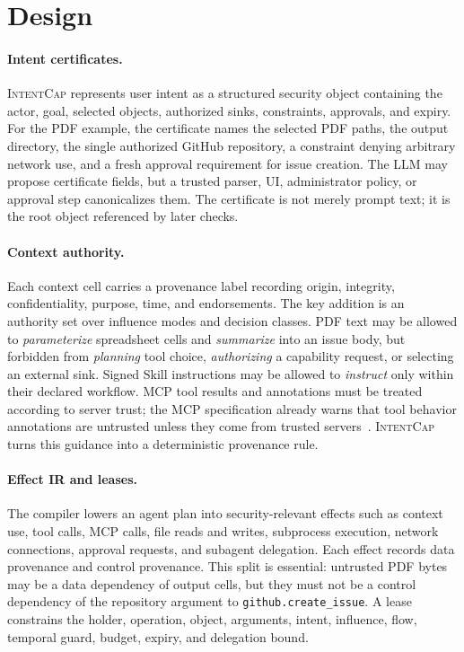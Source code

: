 \documentclass[sigconf,nonacm]{acmart}
\newcommand{\sys}{\textsc{IntentCap}\xspace}
\begin{document}
\section{Design}

\paragraph{Intent certificates.}
\sys represents user intent as a structured security object containing the actor, goal, selected objects, authorized sinks, constraints, approvals, and expiry. For the PDF example, the certificate names the selected PDF paths, the output directory, the single authorized GitHub repository, a constraint denying arbitrary network use, and a fresh approval requirement for issue creation. The LLM may propose certificate fields, but a trusted parser, UI, administrator policy, or approval step canonicalizes them. The certificate is not merely prompt text; it is the root object referenced by later checks.

\paragraph{Context authority.}
Each context cell carries a provenance label recording origin, integrity, confidentiality, purpose, time, and endorsements. The key addition is an authority set over influence modes and decision classes. PDF text may be allowed to \emph{parameterize} spreadsheet cells and \emph{summarize} into an issue body, but forbidden from \emph{planning} tool choice, \emph{authorizing} a capability request, or selecting an external sink. Signed Skill instructions may be allowed to \emph{instruct} only within their declared workflow. MCP tool results and annotations must be treated according to server trust; the MCP specification already warns that tool behavior annotations are untrusted unless they come from trusted servers~\cite{mcp-tools-security}. \sys turns this guidance into a deterministic provenance rule.

\paragraph{Effect IR and leases.}
The compiler lowers an agent plan into security-relevant effects such as context use, tool calls, MCP calls, file reads and writes, subprocess execution, network connections, approval requests, and subagent delegation. Each effect records data provenance and control provenance. This split is essential: untrusted PDF bytes may be a data dependency of output cells, but they must not be a control dependency of the repository argument to \texttt{github.create\_issue}. A lease constrains the holder, operation, object, arguments, intent, influence, flow, temporal guard, budget, expiry, and delegation bound.
\end{document}
